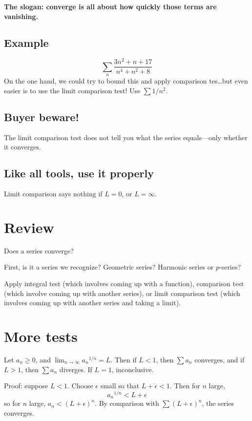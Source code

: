\documentclass[12pt]{article}
\begin{document}
\textbf{The slogan: converge is all about how quickly those terms are
  vanishing.}

\subsection*{Example}

$$
\sum_n \frac{3n^2 + n + 17}{n^4 + n^2 + 8}
$$
On the one hand, we could try to bound this and apply comparison
tes\ldots but even easier is to use the limit comparison test!  Use
$\sum 1/n^2$.

\subsection*{Buyer beware!}

The limit comparison test does not tell you what the series
equals---only whether it converges.

\subsection*{Like all tools, use it properly}

Limit comparison says nothing if $L = 0$, or $L = \infty$.

\section*{Review}

Does a series converge?

First, is it a series we recognize? Geometric series?  Harmonic series
or $p$-series?

Apply integral test (which involves coming up with a function),
comparison test (which involve coming up with another series), or
limit comparison test (which involves coming up with another series
and taking a limit).

\section*{More tests}

Let $a_n \geq 0$, and $\lim_{n \to \infty} {a_n}^{1/n} = L$.  Then if
$L < 1$, then $\sum a_n$ converges, and if $L > 1$, then $\sum a_n$
diverges.  If $L = 1$, inconclusive.

Proof: suppose $L < 1$.  Choose $\epsilon$ small so that $L + \epsilon
< 1$.  Then for $n$ large,
$$
{a_n}^{1/n} < L + \epsilon
$$
so for $n$ large, $a_n < (L + \epsilon)^n$.  By comparison with $\sum
(L + \epsilon)^n$, the series converges.
\end{document}
